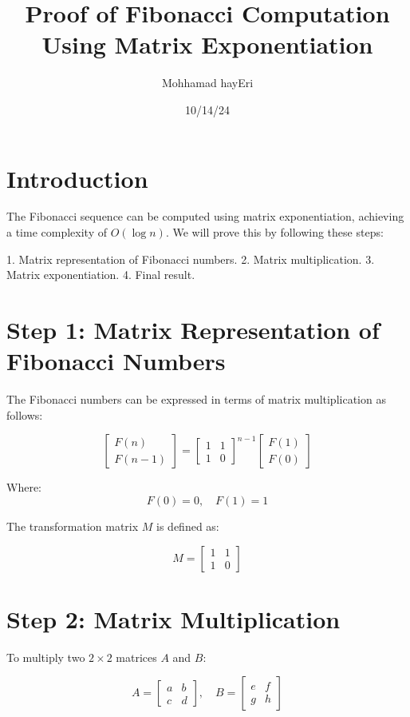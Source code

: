\documentclass{article}
\begin{document}
	
	\title{Proof of Fibonacci Computation Using Matrix Exponentiation}
	\author{Mohhamad hayEri}
	\date{10/14/24}
	\maketitle
	
	\section*{Introduction}
	The Fibonacci sequence can be computed using matrix exponentiation, achieving a time complexity of $O(\log n)$. We will prove this by following these steps:
	
	1. Matrix representation of Fibonacci numbers.
	2. Matrix multiplication.
	3. Matrix exponentiation.
	4. Final result.
	
	\section*{Step 1: Matrix Representation of Fibonacci Numbers}
	The Fibonacci numbers can be expressed in terms of matrix multiplication as follows:
	
	$$\begin{bmatrix} F(n) \\ F(n-1) \end{bmatrix} = \begin{bmatrix} 1 & 1 \\ 1 & 0 \end{bmatrix}^{n-1} \begin{bmatrix} F(1) \\ F(0) \end{bmatrix}$$
	
	Where:
	$$F(0) = 0, \quad F(1) = 1$$
	
	The transformation matrix $M$ is defined as:
	
	$$M = \begin{bmatrix} 1 & 1 \\ 1 & 0 \end{bmatrix}$$
	
	\section*{Step 2: Matrix Multiplication}
	To multiply two $2 \times 2$ matrices $A$ and $B$:
	
	$$A = \begin{bmatrix} a & b \\ c & d \end{bmatrix}, \quad B = \begin{bmatrix} e & f \\ g & h \end{bmatrix}$$
	
\end{document}
